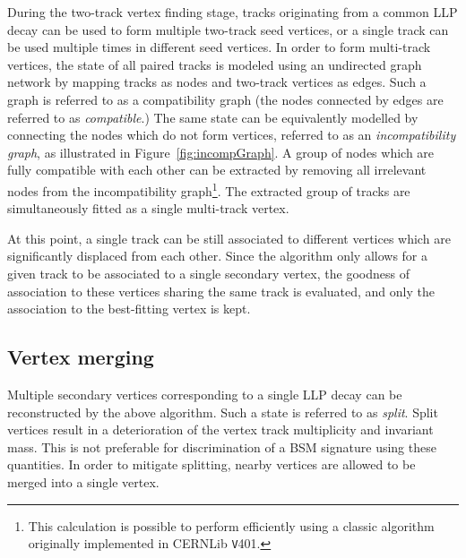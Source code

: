 \documentclass[PUB,UKenglish, texlive=2018]{\ATLASLATEXPATH atlasdoc}
\begin{document}
During the two-track vertex finding stage, tracks originating from a common LLP decay can be used to form multiple two-track seed vertices,
or a single track can be used multiple times in different seed vertices.
In order to form multi-track vertices, the state of all paired tracks is modeled using an undirected graph network by mapping tracks as nodes and two-track vertices as edges. 
Such a graph is referred to as a compatibility graph (the nodes connected by edges are referred to as \emph{compatible}.) 
The same state can be equivalently modelled by connecting the nodes which do not form vertices, referred to as an \emph{incompatibility graph}, as illustrated in Figure~\ref{fig:incompGraph}. 
A group of nodes which are fully compatible with each other can be extracted by removing all irrelevant nodes from the incompatibility graph\footnote{This calculation is possible to perform efficiently using a classic algorithm originally implemented in CERNLib {\texttt V401}.}. 
The extracted group of tracks are simultaneously fitted as a single multi-track vertex. 

At this point, a single track can be still associated to different vertices which are significantly displaced from each other. 
Since the algorithm only allows for a given track to be associated to a single secondary vertex, 
the goodness of association to these vertices sharing the same track is evaluated, and only the association to the best-fitting vertex is kept.

\subsection{Vertex merging}

Multiple secondary vertices corresponding to a single LLP decay can be reconstructed by the above algorithm. Such a state is referred to as \emph{split}. Split vertices result in a deterioration of the vertex track multiplicity and invariant mass.  
This is not preferable for discrimination of a BSM signature using these quantities. In order to mitigate splitting, nearby vertices are allowed to be merged into a single vertex. 
\end{document}
